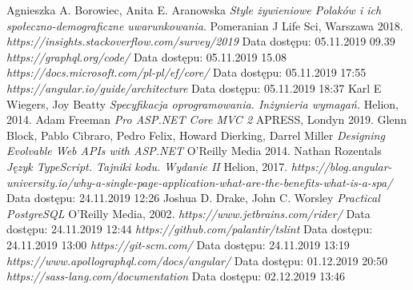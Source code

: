 \begin{thebibliography}{9}
      Agnieszka A. Borowiec, Anita E. Aranowska
      \emph{ Style żywieniowe Polaków i ich społeczno-demograficzne uwarunkowania}.
      Pomeranian J Life Sci, Warszawa
      2018.
     \emph{https://insights.stackoverflow.com/survey/2019 }
     Data dostępu: 05.11.2019 09.39
     \emph{https://graphql.org/code/}
     Data dostępu: 05.11.2019 15.08
     \emph{https://docs.microsoft.com/pl-pl/ef/core/}
     Data dostępu: 05.11.2019 17:55
     \emph{https://angular.io/guide/architecture}
     Data dostępu: 05.11.2019 18:37
     Karl E Wiegers, Joy Beatty
     \emph{Specyfikacja oprogramowania. Inżynieria wymagań.}
     Helion,
     2014.
     Adam Freeman
     \emph{Pro ASP.NET Core MVC 2}
     APRESS, Londyn
     2019.
     Glenn Block, Pablo Cibraro, Pedro Felix, Howard Dierking, Darrel Miller
     \emph{Designing Evolvable Web APIs with ASP.NET}
     O'Reilly Media
     2014.
     Nathan Rozentals
     \emph{Język TypeScript. Tajniki kodu. Wydanie II}
     Helion,
     2017.
     \emph{https://blog.angular-university.io/why-a-single-page-application-what-are-the-benefits-what-is-a-spa/} Data dostępu: 24.11.2019 12:26
     Joshua D. Drake, John C. Worsley
     \emph{Practical PostgreSQL}
     O'Reilly Media,
     2002.
     \emph{https://www.jetbrains.com/rider/}
     Data dostępu: 24.11.2019 12:44
     \emph{https://github.com/palantir/tslint}
     Data dostępu: 24.11.2019 13:00
     \emph{https://git-scm.com/}
     Data dostępu: 24.11.2019 13:19
     \emph{https://www.apollographql.com/docs/angular/}
     Data dostępu: 01.12.2019 20:50
     \emph{https://sass-lang.com/documentation}
     Data dostępu: 02.12.2019 13:46
   
\end{thebibliography}